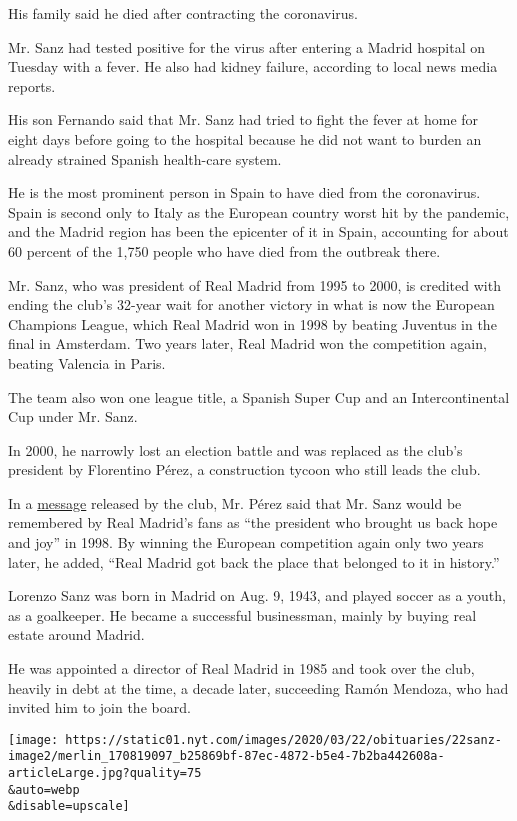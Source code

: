 His family said he died after contracting the coronavirus.

Mr. Sanz had tested positive for the virus after entering a Madrid
hospital on Tuesday with a fever. He also had kidney failure, according
to local news media reports.

His son Fernando said that Mr. Sanz had tried to fight the fever at home
for eight days before going to the hospital because he did not want to
burden an already strained Spanish health-care system.

He is the most prominent person in Spain to have died from the
coronavirus. Spain is second only to Italy as the European country worst
hit by the pandemic, and the Madrid region has been the epicenter of it
in Spain, accounting for about 60 percent of the 1,750 people who have
died from the outbreak there.

Mr. Sanz, who was president of Real Madrid from 1995 to 2000, is
credited with ending the club's 32-year wait for another victory in what
is now the European Champions League, which Real Madrid won in 1998 by
beating Juventus in the final in Amsterdam. Two years later, Real Madrid
won the competition again, beating Valencia in Paris.

The team also won one league title, a Spanish Super Cup and an
Intercontinental Cup under Mr. Sanz.

In 2000, he narrowly lost an election battle and was replaced as the
club's president by Florentino Pérez, a construction tycoon who still
leads the club.

In a
\href{https://www.realmadrid.com/noticias/2020/03/22/declaracion-del-presidente-florentino-perez-sobre-lorenzo-sanz}{message}
released by the club, Mr. Pérez said that Mr. Sanz would be remembered
by Real Madrid's fans as ``the president who brought us back hope and
joy'' in 1998. By winning the European competition again only two years
later, he added, ``Real Madrid got back the place that belonged to it in
history.''

Lorenzo Sanz was born in Madrid on Aug. 9, 1943, and played soccer as a
youth, as a goalkeeper. He became a successful businessman, mainly by
buying real estate around Madrid.

He was appointed a director of Real Madrid in 1985 and took over the
club, heavily in debt at the time, a decade later, succeeding Ramón
Mendoza, who had invited him to join the board.

\texttt{[image: https://static01.nyt.com/images/2020/03/22/obituaries/22sanz-image2/merlin\_170819097\_b25869bf-87ec-4872-b5e4-7b2ba442608a-articleLarge.jpg?quality=75\\\&auto=webp\\\&disable=upscale]}

